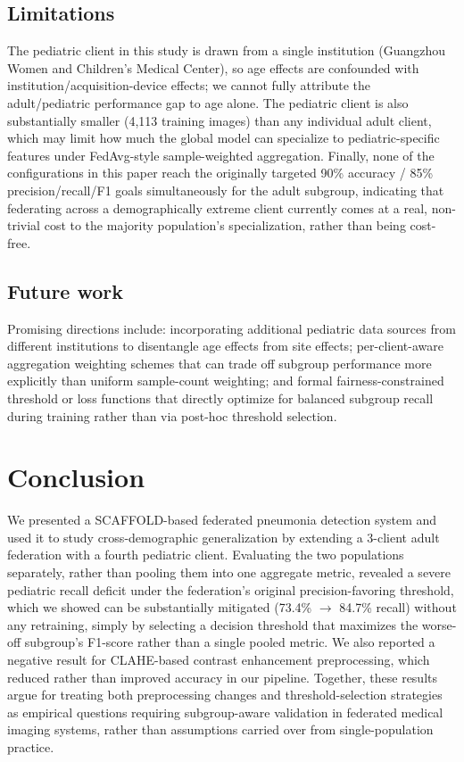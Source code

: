 \documentclass[conference]{IEEEtran}
\begin{document}
\subsection{Limitations}

The pediatric client in this study is drawn from a single institution
(Guangzhou Women and Children's Medical Center), so age effects are
confounded with institution/acquisition-device effects; we cannot fully
attribute the adult/pediatric performance gap to age alone. The pediatric
client is also substantially smaller (4{,}113 training images) than any
individual adult client, which may limit how much the global model can
specialize to pediatric-specific features under FedAvg-style
sample-weighted aggregation. Finally, none of the configurations in this
paper reach the originally targeted 90\% accuracy / 85\% precision/recall/F1
goals simultaneously for the adult subgroup, indicating that federating
across a demographically extreme client currently comes at a real,
non-trivial cost to the majority population's specialization, rather than
being cost-free.

\subsection{Future work}

Promising directions include: incorporating additional pediatric data
sources from different institutions to disentangle age effects from
site effects; per-client-aware aggregation weighting schemes that can trade
off subgroup performance more explicitly than uniform sample-count
weighting; and formal fairness-constrained threshold or loss functions that
directly optimize for balanced subgroup recall during training rather than
via post-hoc threshold selection.

\section{Conclusion}

We presented a SCAFFOLD-based federated pneumonia detection system and used
it to study cross-demographic generalization by extending a 3-client adult
federation with a fourth pediatric client. Evaluating the two populations
separately, rather than pooling them into one aggregate metric, revealed a
severe pediatric recall deficit under the federation's original
precision-favoring threshold, which we showed can be substantially mitigated
(73.4\% $\rightarrow$ 84.7\% recall) without any retraining, simply by
selecting a decision threshold that maximizes the worse-off subgroup's
F1-score rather than a single pooled metric. We also reported a negative
result for CLAHE-based contrast enhancement preprocessing, which reduced
rather than improved accuracy in our pipeline. Together, these results argue
for treating both preprocessing changes and threshold-selection strategies
as empirical questions requiring subgroup-aware validation in federated
medical imaging systems, rather than assumptions carried over from
single-population practice.
\end{document}
